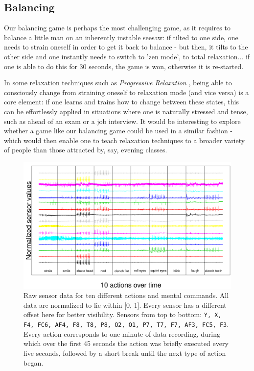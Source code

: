 \documentclass{utue} %
\begin{document}
\subsection{Balancing}
Our balancing game is perhaps the most challenging game, as it requires to balance a little man on an inherently instable seesaw: if tilted to one side, one needs to strain oneself in order to get it back to balance - but then, it tilts to the other side and one instantly needs to switch to 'zen mode', to total relaxation... if one is able to do this for 30 seconds, the game is won, otherwise it is re-started.

In some relaxation techniques such as \textit{Progressive Relaxation} \cite{Jacobson1938}, being able to consciously change from straining oneself to relaxation mode (and vice versa) is a core element: if one learns and trains how to change between these states, this can be effortlessly applied in situations where one is naturally stressed and tense, such as ahead of an exam or a job interview. It would be interesting to explore whether a game like our balancing game could be used in a similar fashion - which would then enable one to teach relaxation techniques to a broader variety of people than those attracted by, say, evening classes.

\begin{figure}[h!]
	\centering
	\includegraphics[width=1.0\textwidth]{images/sensor_values.png}
	\caption{Raw sensor data for ten different actions and mental commands. All data are normalized to lie within [0, 1]. Every sensor has a different offset here for better visibility. Sensors from top to bottom: \texttt{Y, X, F4, FC6, AF4, F8, T8, P8, O2, O1, P7, T7, F7, AF3, FC5, F3}. Every action corresponds to one minute of data recording, during which over the first 45 seconds the action was briefly executed every five seconds, followed by a short break until the next type of action began.}
	\label{fig:sensor_values}
\end{figure}
\end{document}
